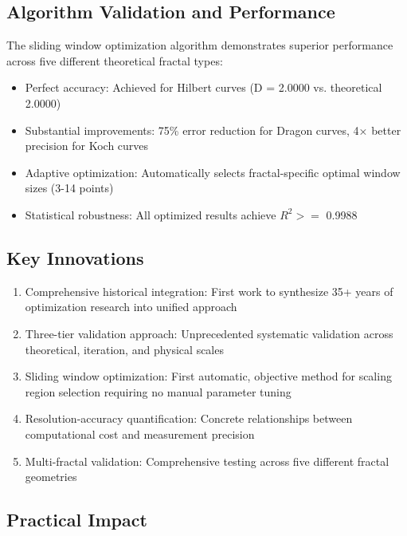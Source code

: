 \documentclass[preprint,12pt]{elsarticle}
\def\textbf#1{#1}%
\def\ge{>=}%
\begin{document}
\subsection{Algorithm Validation and Performance}

The sliding window optimization algorithm demonstrates superior performance across five different theoretical fractal types:

\begin{itemize}
\item \textbf{Perfect accuracy}: Achieved for Hilbert curves (D = 2.0000 vs. theoretical 2.0000)
\item \textbf{Substantial improvements}: 75\% error reduction for Dragon curves, 4× better precision for Koch curves
\item \textbf{Adaptive optimization}: Automatically selects fractal-specific optimal window sizes (3-14 points)
\item \textbf{Statistical robustness}: All optimized results achieve $R^2 \ge$ 0.9988
\end{itemize}

\subsection{Key Innovations}

\begin{enumerate}
\item \textbf{Comprehensive historical integration}: First work to synthesize 35+ years of optimization research into unified approach

\item \textbf{Three-tier validation approach}: Unprecedented systematic validation across theoretical, iteration, and physical scales

\item \textbf{Sliding window optimization}: First automatic, objective method for scaling region selection requiring no manual parameter tuning

\item \textbf{Resolution-accuracy quantification}: Concrete relationships between computational cost and measurement precision

\item \textbf{Multi-fractal validation}: Comprehensive testing across five different fractal geometries
\end{enumerate}

\subsection{Practical Impact}
\end{document}
